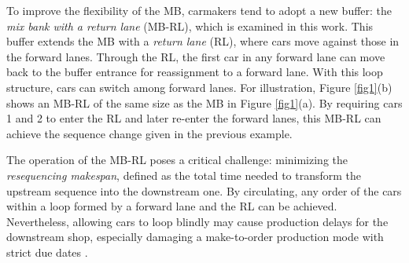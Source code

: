\documentclass[12pt]{article}
\begin{document}
To improve the flexibility of the MB, carmakers tend to adopt a new buffer: the \textit{mix bank with a return lane} (MB-RL), which is examined in this work. This buffer extends the MB with a \textit{return lane} (RL), where cars move against those in the forward lanes. Through the RL, the first car in any forward lane can move back to the buffer entrance for reassignment to a forward lane. With this loop structure, cars can switch among forward lanes. For illustration, Figure \ref{fig1}(b) shows an MB-RL of the same size as the MB in Figure \ref{fig1}(a). By requiring cars 1 and 2 to enter the RL and later re-enter the forward lanes, this MB-RL can achieve the sequence change given in the previous example.





The operation of the MB-RL poses a critical challenge: minimizing the \textit{resequencing makespan}, defined as the total time needed to transform the upstream sequence into the downstream one. By circulating, any order of the cars within a loop formed by a forward lane and the RL can be achieved. Nevertheless, allowing cars to loop blindly may cause production delays for the downstream shop, especially damaging a make-to-order production mode with strict due dates \citep{boysen2009sequencing}.
\end{document}
